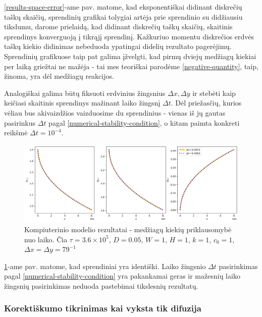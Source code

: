 \ref{results-space-error}-ame pav. matome, kad eksponentiškai didinant diskrečių taškų skaičių, sprendinių grafikai tolygiai artėja prie sprendinio su didžiausiu tikslumu, darome prielaidą, kad didinant diskrečių taškų skaičių, skaitinis sprendinys konverguoją į tikrąjį sprendinį. Kažkuriuo momentu diskrečios erdvės taškų kiekio didinimas nebeduoda ypatingai didelių rezultato pagerėjimų. Sprendinių grafikuose taip pat galima įžvelgti, kad pirmų dviejų medžiagų kiekiai per laiką griežtai ne mažėja - tai mes teoriškai parodėme \eqref{negative-quantity}, taip, žinoma, yra dėl  medžiagų reakcijos. 

Analogiškai galima būtų fiksuoti erdvinius žingsnius $\Delta x, \Delta y$ ir stebėti kaip keičiasi skaitinis sprendinys mažinant laiko žingsnį $\Delta t$. Dėl priežasčių, kurios vėliau bus akivaizdžios vaizduosime du sprendinius - vienas iš jų gautas pasirinkus $\Delta t$ pagal \eqref{numerical-stability-condition}, o kitam paimta konkreti reikšmė $\Delta t = 10^{-4}$.

\begin{figure}[h!]

\centering

\caption{Kompiuterinio modelio rezultatai - medžiagų kiekių priklausomybė nuo laiko. Čia $\tau=3.6\times 10^5$, $D=0.05$, $W = 1$, $H=1$, $k = 1$, $c_0 = 1$, $\Delta x = \Delta y = 79^{-1}$}

\includegraphics[width=\textwidth]{../assets/time-error-2.png}

\label{time-error}

\end{figure}

\ref{time-error}-ame pav. matome, kad sprendiniai yra identiški. Laiko žingsnio  $\Delta t$ pasirinkimas pagal \eqref{numerical-stability-condition} yra pakankamai geras ir mažesnių laiko žingsnių pasirinkimas neduoda pastebimai tikslesnių rezultatų.

\subsubsection*{Korektiškumo tikrinimas kai vyksta tik difuzija}

